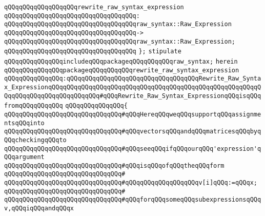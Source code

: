 \verb|qQQqqQQqqQQqqQQqqQQqrewrite_raw_syntax_expression|\newline
\verb|qQQqqQQqqQQqqQQqqQQqqQQqqQQqqQQqqQQq:|\newline
\verb|qQQqqQQqqQQqqQQqqQQqqQQqqQQqqQQqqQQqraw_syntax::Raw_Expression|\newline
\verb|qQQqqQQqqQQqqQQqqQQqqQQqqQQqqQQqqQQq->|\newline
\verb|qQQqqQQqqQQqqQQqqQQqqQQqqQQqqQQqqQQqraw_syntax::Raw_Expression;|\newline
\verb|qQQqqQQqqQQqqQQqqQQqqQQqqQQqqQQqqQQq|\newline
\verb|};|\newline
\newline
\newline
\verb|stipulate|\newline
\verb|qQQqqQQqqQQqqQQqincludeqQQqpackageqQQqqQQqqQQqraw_syntax;|\newline
\verb|herein|\newline
\newline
\verb|qQQqqQQqqQQqqQQqpackageqQQqqQQqqQQqrewrite_raw_syntax_expression|\newline
\verb|qQQqqQQqqQQqqQQq:qQQqqQQqqQQqqQQqqQQqqQQqqQQqqQQqqQQqRewrite_Raw_Syntax_ExpressionqQQqqQQqqQQqqQQqqQQqqQQqqQQqqQQqqQQqqQQqqQQqqQQqqQQqqQQqqQQqqQQqqQQqqQQqqQQqqQQqqQQq#qQQqRewrite_Raw_Syntax_ExpressionqQQqisqQQqfromqQQqqQQqqQQq|\newline
\verb|qQQqqQQqqQQqqQQq{|\newline
\verb|qQQqqQQqqQQqqQQqqQQqqQQqqQQqqQQq#qQQqHereqQQqweqQQqsupportqQQqassignmentsqQQqinto|\newline
\verb|qQQqqQQqqQQqqQQqqQQqqQQqqQQqqQQq#qQQqvectorsqQQqandqQQqmatricesqQQqbyqQQqcheckingqQQqto|\newline
\verb|qQQqqQQqqQQqqQQqqQQqqQQqqQQqqQQq#qQQqseeqQQqifqQQqourqQQq'expression'qQQqargument|\newline
\verb|qQQqqQQqqQQqqQQqqQQqqQQqqQQqqQQq#qQQqisqQQqofqQQqtheqQQqform|\newline
\verb|qQQqqQQqqQQqqQQqqQQqqQQqqQQqqQQq#|\newline
\verb|qQQqqQQqqQQqqQQqqQQqqQQqqQQqqQQq#qQQqqQQqqQQqqQQqqQQqv[i]qQQq:=qQQqx;|\newline
\verb|qQQqqQQqqQQqqQQqqQQqqQQqqQQqqQQq#|\newline
\verb|qQQqqQQqqQQqqQQqqQQqqQQqqQQqqQQq#qQQqforqQQqsomeqQQqsubexpressionsqQQqv,qQQqiqQQqandqQQqx|\newline
